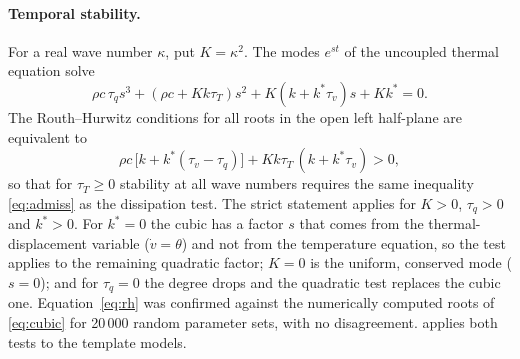 \paragraph{Temporal stability.} For a real wave number $\kappa$, put $K=\kappa^2$. The modes $e^{st}$ of the uncoupled thermal equation solve
\begin{equation}\label{eq:cubic}
\rho c\,\tau_q s^3+(\rho c+Kk\tau_T)s^2+K(k+k^*\tau_v)s+Kk^*=0 .
\end{equation}
The Routh--Hurwitz conditions for all roots in the open left half-plane are equivalent to
\begin{equation}\label{eq:rh}
\rho c\,\bigl[k+k^*(\tau_v-\tau_q)\bigr]+Kk\tau_T\,(k+k^*\tau_v)>0 ,
\end{equation}
so that for $\tau_T\ge0$ stability at all wave numbers requires the same inequality \eqref{eq:admiss} as the dissipation test. The strict statement applies for $K>0$, $\tau_q>0$ and $k^*>0$. For $k^*=0$ the cubic has a factor $s$ that comes from the thermal-displacement variable ($\dot v=\theta$) and not from the temperature equation, so the test applies to the remaining quadratic factor; $K=0$ is the uniform, conserved mode ($s=0$); and for $\tau_q=0$ the degree drops and the quadratic test replaces the cubic one. Equation~\eqref{eq:rh} was confirmed against the numerically computed roots of \eqref{eq:cubic} for 20\,000 random parameter sets, with no disagreement.  applies both tests to the template models.

